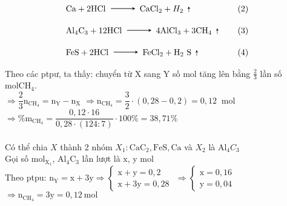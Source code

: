 \begin{vd}
{\[\begin{aligned}
							& \mathrm{Ca}+2\mathrm{HCl} \xrightarrow \mathrm{CaCl}_2+H_2 \uparrow&\quad \left(2\right)\\
							& \mathrm{Al}_4\mathrm{C}_3+12 \mathrm{HCl} \xrightarrow 4 \mathrm{AlCl}_3+3\mathrm{CH}_4 \uparrow &\quad \left(3\right)\\
							& \mathrm{FeS}+2\mathrm{HCl} \xrightarrow \mathrm{FeCl}_2+\mathrm{H}_2 \mathrm{~S} \uparrow&\quad \left(4\right)
				\end{aligned}\]
				Theo các ptpư, ta thấy: chuyển từ $\mathrm{X}$ sang $\mathrm{Y}$ số mol tăng lên bằng $\frac{2}{3}$ lần số $\mathrm{mol} \mathrm{CH}_4$.
				\\
			 	$\Rightarrow \dfrac{2}{3} \mathrm{n}_{\mathrm{CH}_4}=\mathrm{n}_{\mathrm{Y}}-\mathrm{n}_{\mathrm{X}}$
		  		$\Rightarrow \mathrm{n}_{\mathrm{CH}_4}=\dfrac{3}{2}\cdot(0,28-0,2)=0,12$ $\mathrm{~mol}$ 
		  		\\
				$\Rightarrow \%\mathrm{m}_{\mathrm{CH}_4}=\dfrac{0,12 \cdot 16}{0,28 \cdot(124: 7)} \cdot 100 \%=38,71 \% $
				\\\\
				 Có thể chia $X$ thành 2 nhóm $X_1: \mathrm{CaC}_2, \mathrm{FeS}, \mathrm{Ca}$ và $X_2$ là $\mathrm{Al}_4 C_3$
				\\
				Gọi số $\mathrm{mol}_{\mathrm{X}_1}$, $\mathrm{Al}_4\mathrm{C}_3$ lần lượt là $\mathrm{x}$, $\mathrm{y}$ $\mathrm{mol}$
				\\
				Theo ptpu: $\mathrm{n}_{\mathrm{Y}}=\mathrm{x}+3 \mathrm{y} \Rightarrow\left\{\begin{array}{l}\mathrm{x}+\mathrm{y}=0,2 \\ \mathrm{x}+3 \mathrm{y}=0,28\end{array}\right.$
				$\Rightarrow\left\{\begin{array}{l}\mathrm{x}=0,16 \\ \mathrm{y}=0,04\end{array}\right.$ 
				$\Rightarrow \mathrm{n}_{\mathrm{CH}_4}=3 \mathrm{y}=0,12 \mathrm{~mol}$
	}
\end{vd}

